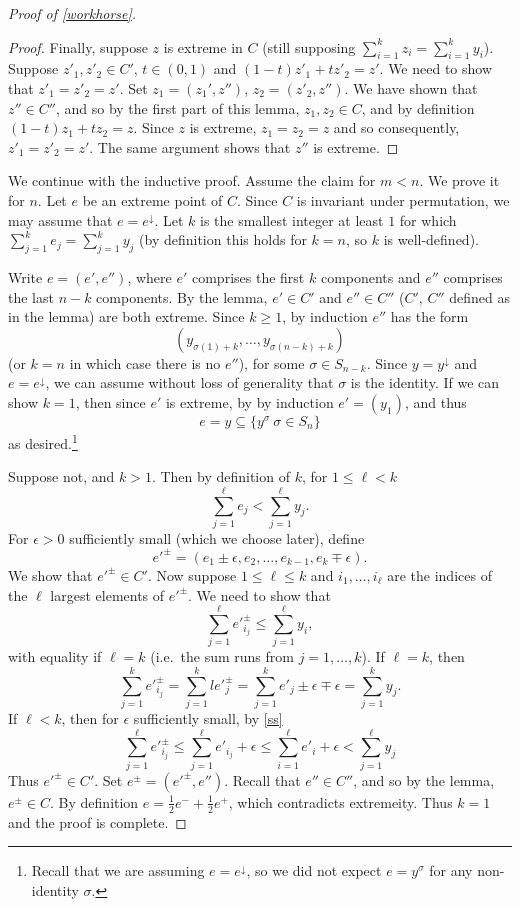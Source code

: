 \documentclass[12pt]{amsart}
\begin{document}
\begin{proof}[Proof of \cref{workhorse}]
\begin{proof}
Finally, suppose $z$ is extreme in $C$ (still supposing $\sum_{i=1}^k z_i = \sum_{i=1}^k y_i$). Suppose $z'_1,z'_2 \in C'$, $t \in (0,1)$  and $(1-t)z'_1 + tz'_2 = z'$. We need to show that $z'_1 = z'_2 = z'$. Set $z_1 = (z_1',z'')$, $z_2 = (z'_2,z'')$. We have shown that $z'' \in C''$, and so by the first part of this lemma, $z_1,z_2 \in C$, and by definition $(1-t)z_1 + tz_2 = z$. Since $z$ is extreme, $z_1 = z_2 = z$ and so consequently, $z'_1 = z'_2 = z'$. The same argument shows that $z''$ is extreme.
\end{proof}

We continue with the inductive proof. Assume the claim for $m < n$. We prove it for $n$. Let $e$ be an extreme point of $C$. Since $C$ is invariant under permutation, we may assume that $e = e^{\downarrow}$. Let $k$ is the smallest integer at least $1$ for which $\sum_{j=1}^k e_j = \sum_{j=1}^k y_j$ (by definition this holds for $k=n$, so $k$ is well-defined).

Write $e = (e',e'')$, where $e'$ comprises the first $k$ components and $e''$ comprises the last $n-k$ components. By the lemma, $e' \in C'$ and $e'' \in C''$ ($C'$, $C''$ defined as in the lemma) are both extreme. Since $k \geq 1$, by induction $e''$ has the form
\[(y_{\sigma(1)+k},\ldots,y_{\sigma(n-k)+k})\] (or $k = n$ in which case there is no $e''$), for some $\sigma \in S_{n-k}$. Since $y = y^\downarrow$ and $e = e^{\downarrow}$, we can assume without loss of generality that $\sigma$ is the identity. If we can show $k = 1$, then since $e'$ is extreme, by by induction $e' = (y_1)$, and thus
\[e = y \subseteq \{y^\sigma \: \sigma \in S_n\}\] as desired.\footnote{Recall that we are assuming $e = e^{\downarrow}$, so we did not expect $e = y^{\sigma}$ for any non-identity $\sigma$.}

Suppose not, and $k > 1$. Then by definition of $k$, for $1 \leq \ell < k$
\begin{equation}\label{ss}\sum_{j=1}^{\ell} e_j < \sum_{j=1}^{\ell} y_j.\end{equation} 
For $\epsilon > 0$ sufficiently small (which we choose later), define 
\[{e'}^{\pm} = (e_1\pm \epsilon,e_2,\ldots,e_{k-1},e_k \mp \epsilon).\] We show that ${e'}^{\pm} \in C'$. 
Now suppose $1 \leq \ell \leq k$ and $i_1,\ldots, i_\ell$ are the indices of the $\ell$ largest elements of ${e'}^{\pm}$. We need to show that
\[\sum_{j=1}^\ell {e'}^{\pm}_{i_j} \leq \sum_{j=1}^\ell y_i,\]
with equality if $\ell = k$ (i.e.\ the sum runs from $j=1,\ldots,k$). If $\ell = k$, then
\[\sum_{j=1}^k {e'}^{\pm}_{i_j}  = \sum_{j=1}^kl{e'}^{\pm}_{j} = \sum_{j=1}^k e'_j \pm \epsilon \mp \epsilon = \sum_{j=1}^k y_j.\] If $\ell < k$, then for $\epsilon$ sufficiently small, by \eqref{ss}
\[\sum_{j=1}^\ell {e'}^{\pm}_{i_j} \leq \sum_{j=1}^\ell {e'}_{i_j} + \epsilon \leq \sum_{i=1}^\ell e'_i +\epsilon < \sum_{j=1}^{\ell} y_j\]
Thus ${e'}^{\pm} \in C'$. Set $e^{\pm} = ({e'}^{\pm},e'')$. Recall that $e'' \in C''$, and so by the lemma, $e^{\pm} \in C$. By definition $e = \frac{1}{2}e^- + \frac{1}{2}e^+$, which contradicts extremeity. Thus $k = 1$ and the proof is complete.
\end{proof}
\end{document}
